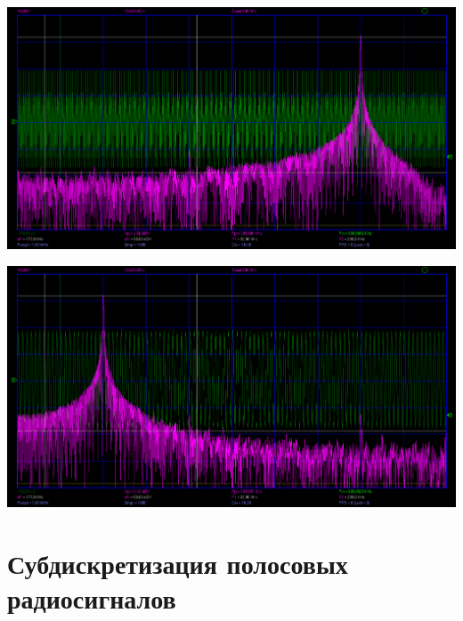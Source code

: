 \documentclass[12pt,a4paper]{article}
\begin{document}
\begin{center}
	\includegraphics[width=.8\linewidth]{data/1-3_rect_600KHZ}\hfill
\end{center}	
\begin{center}
	\includegraphics[width=.8\linewidth]{data/1-3_rect_900KHZ}\hfill
\end{center}	

\newpage



\section*{Субдискретизация полосовых радиосигналов}
\end{document}
